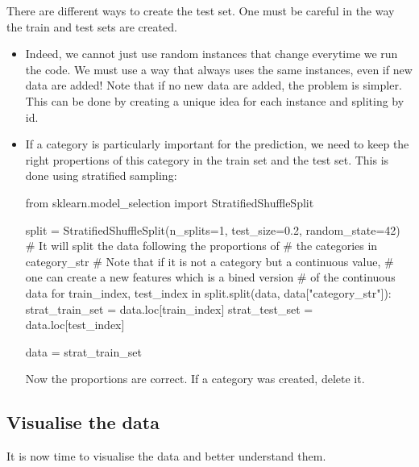 There are different ways to create the test set.
One must be careful in the way the train and test sets are created.
\begin{itemize}
  \item Indeed, we cannot just use random instances that change everytime we run the code.
    We must use a way that always uses the same instances, even if new data are added!
    Note that if no new data are added, the problem is simpler.
    This can be done by creating a unique idea for each instance and spliting by id.
  \item If a category is particularly important for the prediction, we need to keep the right propertions of this category in the train set and the test set.
  This is done using stratified sampling:
  \begin{python}
    from sklearn.model_selection import StratifiedShuffleSplit

    split = StratifiedShuffleSplit(n_splits=1, test_size=0.2,
                                   random_state=42)
    # It will split the data following the proportions of
    # the categories in category_str
    # Note that if it is not a category but a continuous value,
    # one can create a new features which is a bined version
    # of the continuous data
    for train_index, test_index in split.split(data,
                                        data["category_str"]):
      strat_train_set = data.loc[train_index]
      strat_test_set = data.loc[test_index]

    data = strat_train_set
  \end{python}
  Now the proportions are correct.
  If a category was created, delete it.
\end{itemize}

\subsection{Visualise the data}
It is now time to visualise the data and better understand them.

